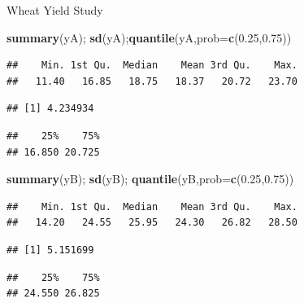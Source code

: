 \documentclass[9pt,ignorenonframetext,]{beamer}
\newenvironment{Shaded}{\begin{snugshade}}{\end{snugshade}}
\newcommand{\KeywordTok}[1]{\textcolor[rgb]{0.13,0.29,0.53}{\textbf{{#1}}}}
\newcommand{\DataTypeTok}[1]{\textcolor[rgb]{0.13,0.29,0.53}{{#1}}}
\newcommand{\FloatTok}[1]{\textcolor[rgb]{0.00,0.00,0.81}{{#1}}}
\newcommand{\NormalTok}[1]{{#1}}
\begin{document}
\begin{frame}[fragile]{Wheat Yield Study}

\begin{Shaded}
\begin{Highlighting}[]
\KeywordTok{summary}\NormalTok{(yA); }\KeywordTok{sd}\NormalTok{(yA);}\KeywordTok{quantile}\NormalTok{(yA,}\DataTypeTok{prob=}\KeywordTok{c}\NormalTok{(}\FloatTok{0.25}\NormalTok{,}\FloatTok{0.75}\NormalTok{))}
\end{Highlighting}
\end{Shaded}

\begin{verbatim}
##    Min. 1st Qu.  Median    Mean 3rd Qu.    Max. 
##   11.40   16.85   18.75   18.37   20.72   23.70
\end{verbatim}

\begin{verbatim}
## [1] 4.234934
\end{verbatim}

\begin{verbatim}
##    25%    75% 
## 16.850 20.725
\end{verbatim}

\begin{Shaded}
\begin{Highlighting}[]
\KeywordTok{summary}\NormalTok{(yB); }\KeywordTok{sd}\NormalTok{(yB); }\KeywordTok{quantile}\NormalTok{(yB,}\DataTypeTok{prob=}\KeywordTok{c}\NormalTok{(}\FloatTok{0.25}\NormalTok{,}\FloatTok{0.75}\NormalTok{))}
\end{Highlighting}
\end{Shaded}

\begin{verbatim}
##    Min. 1st Qu.  Median    Mean 3rd Qu.    Max. 
##   14.20   24.55   25.95   24.30   26.82   28.50
\end{verbatim}

\begin{verbatim}
## [1] 5.151699
\end{verbatim}

\begin{verbatim}
##    25%    75% 
## 24.550 26.825
\end{verbatim}

\end{frame}
\end{document}
